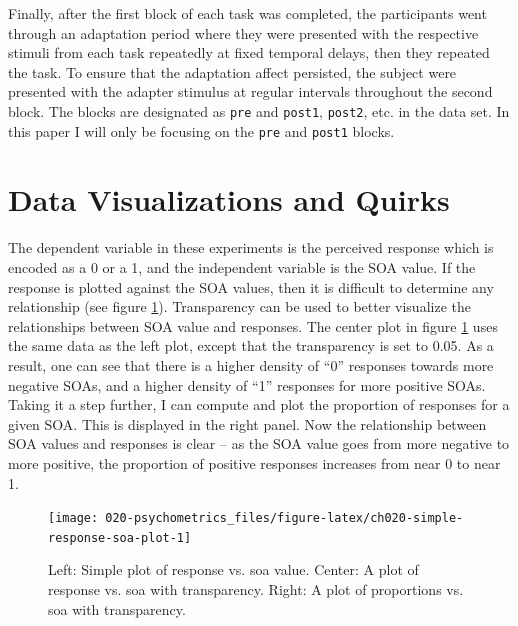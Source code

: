 \documentclass[11pt, oneside, openany]{scrbook}
\begin{document}
Finally, after the first block of each task was completed, the participants went through an adaptation period where they were presented with the respective stimuli from each task repeatedly at fixed temporal delays, then they repeated the task. To ensure that the adaptation affect persisted, the subject were presented with the adapter stimulus at regular intervals throughout the second block. The blocks are designated as \texttt{pre} and \texttt{post1}, \texttt{post2}, etc. in the data set. In this paper I will only be focusing on the \texttt{pre} and \texttt{post1} blocks.

\hypertarget{data-visualizations-and-quirks}{%
\section{Data Visualizations and Quirks}\label{data-visualizations-and-quirks}}

The dependent variable in these experiments is the perceived response which is encoded as a 0 or a 1, and the independent variable is the SOA value. If the response is plotted against the SOA values, then it is difficult to determine any relationship (see figure \ref{fig:ch020-simple-response-soa-plot}). Transparency can be used to better visualize the relationships between SOA value and responses. The center plot in figure \ref{fig:ch020-simple-response-soa-plot} uses the same data as the left plot, except that the transparency is set to 0.05. As a result, one can see that there is a higher density of ``0'' responses towards more negative SOAs, and a higher density of ``1'' responses for more positive SOAs. Taking it a step further, I can compute and plot the proportion of responses for a given SOA. This is displayed in the right panel. Now the relationship between SOA values and responses is clear -- as the SOA value goes from more negative to more positive, the proportion of positive responses increases from near 0 to near 1.

\begin{figure}

{\centering \texttt{[image: 020-psychometrics\_files/figure-latex/ch020-simple-response-soa-plot-1]} 

}

\caption{Left: Simple plot of response vs. soa value. Center: A plot of response vs. soa with transparency. Right: A plot of proportions vs. soa with transparency.}\label{fig:ch020-simple-response-soa-plot}
\end{figure}
\end{document}
